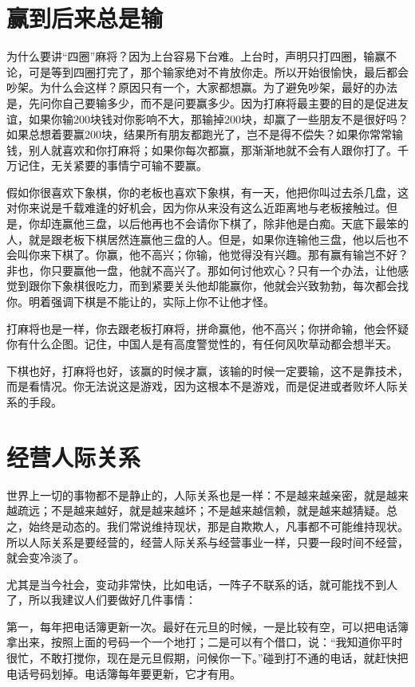 \documentclass[fontset=fandol, a4paper, 12pt, openright]{ctexbook}
\begin{document}
\section{赢到后来总是输}

为什么要讲“四圈”麻将？因为上台容易下台难。上台时，声明只打四圈，输赢不论，可是等到四圈打完了，那个输家绝对不肯放你走。所以开始很愉快，最后都会吵架。为什么会这样？原因只有一个，大家都想赢。为了避免吵架，最好的办法是，先问你自己要输多少，而不是问要赢多少。因为打麻将最主要的目的是促进友谊，如果你输200块钱对你影响不大，那输掉200块，却赢了一些朋友不是很好吗？如果总想着要赢200块，结果所有朋友都跑光了，岂不是得不偿失？如果你常常输钱，别人就喜欢和你打麻将；如果你每次都赢，那渐渐地就不会有人跟你打了。千万记住，无关紧要的事情宁可输不要赢。

假如你很喜欢下象棋，你的老板也喜欢下象棋，有一天，他把你叫过去杀几盘，这对你来说是千载难逢的好机会，因为你从来没有这么近距离地与老板接触过。但是，你却连赢他三盘，以后他再也不会请你下棋了，除非他是白痴。天底下最笨的人，就是跟老板下棋居然连赢他三盘的人。但是，如果你连输他三盘，他以后也不会叫你来下棋了。你赢，他不高兴；你输，他觉得没有兴趣。那有赢有输岂不好？非也，你只要赢他一盘，他就不高兴了。那如何讨他欢心？只有一个办法，让他感觉到跟你下象棋很吃力，而到紧要关头他却能赢你，他就会兴致勃勃，每次都会找你。明着强调下棋是不能让的，实际上你不让他才怪。

打麻将也是一样，你去跟老板打麻将，拼命赢他，他不高兴；你拼命输，他会怀疑你有什么企图。记住，中国人是有高度警觉性的，有任何风吹草动都会想半天。

下棋也好，打麻将也好，该赢的时候才赢，该输的时候一定要输，这不是靠技术，而是看情况。你无法说这是游戏，因为这根本不是游戏，而是促进或者败坏人际关系的手段。

\section{经营人际关系}

世界上一切的事物都不是静止的，人际关系也是一样：不是越来越亲密，就是越来越疏远；不是越来越好，就是越来越坏；不是越来越信赖，就是越来越猜疑。总之，始终是动态的。我们常说维持现状，那是自欺欺人，凡事都不可能维持现状。所以人际关系是要经营的，经营人际关系与经营事业一样，只要一段时间不经营，就会变冷淡了。

尤其是当今社会，变动非常快，比如电话，一阵子不联系的话，就可能找不到人了，所以我建议人们要做好几件事情：

第一，每年把电话簿更新一次。最好在元旦的时候，一是比较有空，可以把电话簿拿出来，按照上面的号码一个一个地打；二是可以有个借口，说：“我知道你平时很忙，不敢打搅你，现在是元旦假期，问候你一下。”碰到打不通的电话，就赶快把电话号码划掉。电话簿每年要更新，它才有用。
\end{document}
